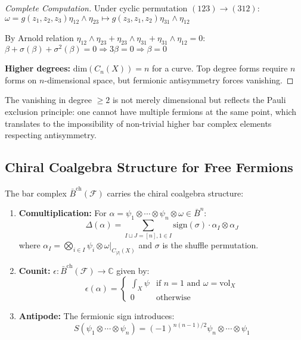 \begin{proof}[Complete Computation]
Under cyclic permutation $(123) \to (312)$:
$\omega = g(z_1,z_2,z_3)\eta_{12} \wedge \eta_{23} \mapsto g(z_3,z_1,z_2)\eta_{31} \wedge \eta_{12}$

By Arnold relation $\eta_{12} \wedge \eta_{23} + \eta_{23} \wedge \eta_{31} + \eta_{31} \wedge \eta_{12} = 0$:
$\beta + \sigma(\beta) + \sigma^2(\beta) = 0 \Rightarrow 3\beta = 0 \Rightarrow \beta = 0$

\textbf{Higher degrees:} $\text{dim}(C_n(X)) = n$ for a curve. Top degree forms require $n$ forms on $n$-dimensional space, but fermionic antisymmetry forces vanishing.
\end{proof}

\begin{remark}
The vanishing in degree $\geq 2$ is not merely dimensional but reflects the Pauli exclusion principle: one cannot have multiple fermions at the same point, which translates to the impossibility of non-trivial higher bar complex elements respecting antisymmetry.
\end{remark}

 
\subsection{Chiral Coalgebra Structure for Free Fermions}

\begin{theorem}\label{thm:fermion-bar-coalg}
The bar complex $\bar{B}^{\text{ch}}(\mathcal{F})$ carries the chiral coalgebra structure:
\begin{enumerate}
\item \textbf{Comultiplication:} For $\alpha = \psi_1 \otimes \cdots \otimes \psi_n \otimes \omega \in \bar{B}^n$:
\[
\Delta(\alpha) = \sum_{I \sqcup J = [n], 1 \in I} \text{sign}(\sigma) \cdot \alpha_I \otimes \alpha_J
\]
where $\alpha_I = \bigotimes_{i \in I} \psi_i \otimes \omega|_{C_{|I|}(X)}$ and $\sigma$ is the shuffle permutation.

\item \textbf{Counit:} $\epsilon: \bar{B}^{\text{ch}}(\mathcal{F}) \to \mathbb{C}$ given by:
\[
\epsilon(\alpha) = \begin{cases}
\int_X \psi & \text{if } n = 1 \text{ and } \omega = \text{vol}_X \\
0 & \text{otherwise}
\end{cases}
\]

\item \textbf{Antipode:} The fermionic sign introduces:
\[
S(\psi_1 \otimes \cdots \otimes \psi_n) = (-1)^{n(n-1)/2} \psi_n \otimes \cdots \otimes \psi_1
\]
\end{enumerate}
\end{theorem}

